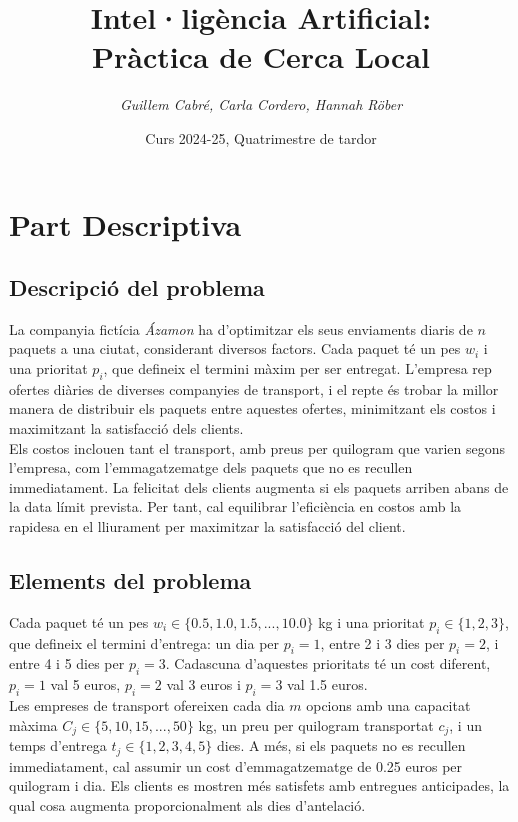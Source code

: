 \documentclass[a4paper]{article}
\title{\textbf{Intel·ligència Artificial:\\
		Pràctica de Cerca Local}}
\author{\emph{Guillem Cabré, Carla Cordero, Hannah Röber}}
\date{Curs 2024-25, Quatrimestre de tardor}
\begin{document}
	
	\begin{titlepage}
		\clearpage\maketitle
		\thispagestyle{empty}
	\end{titlepage}
	
	\tableofcontents
	\clearpage
	
	\section{Part Descriptiva}
	
	\subsection{Descripció del problema}
	
	La companyia fictícia \emph{Ázamon} ha d'optimitzar els seus enviaments diaris de $n$ paquets a una ciutat, considerant diversos factors. Cada paquet té un pes $w_i$ i una prioritat $p_i$, que defineix el termini màxim per ser entregat. L'empresa rep ofertes diàries de diverses companyies de transport, i el repte és trobar la millor manera de distribuir els paquets entre aquestes ofertes, minimitzant els costos i maximitzant la satisfacció dels clients. \\
	
	Els costos inclouen tant el transport, amb preus per quilogram que varien segons l'empresa, com l'emmagatzematge dels paquets que no es recullen immediatament. La felicitat dels clients augmenta si els paquets arriben abans de la data límit prevista. Per tant, cal equilibrar l'eficiència en costos amb la rapidesa en el lliurament per maximitzar la satisfacció del client. \\
	
	\subsection{Elements del problema}
	
	Cada paquet té un pes $w_i \in \{0.5, 1.0, 1.5, ..., 10.0\}$ kg i una prioritat $p_i \in \{1, 2, 3\}$, que defineix el termini d'entrega: un dia per $p_i = 1$, entre 2 i 3 dies per $p_i = 2$, i entre 4 i 5 dies per $p_i = 3$. Cadascuna d'aquestes prioritats té un cost diferent, $p_i = 1$ val 5 euros, $p_i = 2$ val 3 euros i $p_i = 3$ val 1.5 euros. \\
	
	Les empreses de transport ofereixen cada dia $m$ opcions amb una capacitat màxima $C_j \in \{5, 10, 15, ..., 50\}$ kg, un preu per quilogram transportat $c_j$, i un temps d'entrega $t_j \in \{1, 2, 3, 4, 5\}$ dies. A més, si els paquets no es recullen immediatament, cal assumir un cost d'emmagatzematge de 0.25 euros per quilogram i dia. Els clients es mostren més satisfets amb entregues anticipades, la qual cosa augmenta proporcionalment als dies d'antelació. \\
\end{document}

